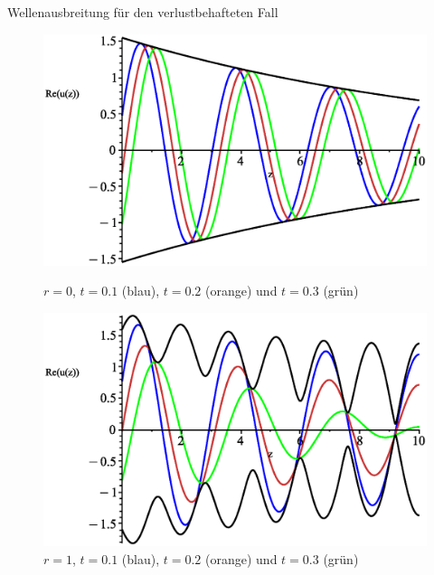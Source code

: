 \documentclass{beamer}
\begin{document}
\begin{frame}{Wellenausbreitung für den verlustbehafteten Fall}
    \begin{figure}[H]
        \begin{minipage}{0.32\textwidth}
            \centering
            \includegraphics[width=\linewidth]{../graphics/Enveloppe/verlustbehaftet/R0}
            \caption*{$r=0$, $t=0.1$ (blau), $t=0.2$ (orange) und $t=0.3$ (grün)}
        \end{minipage}
        \hfill
        \begin{minipage}{0.32\textwidth}
            \centering
            \includegraphics[width=\linewidth]{../graphics/Enveloppe/verlustbehaftet/R1}
            \caption*{$r=1$, $t=0.1$ (blau), $t=0.2$ (orange) und $t=0.3$ (grün)}
        \end{minipage}
        \hfill
        \begin{minipage}{0.32\textwidth}
            \centering

\end{minipage}
\end{figure}
\end{frame}
\end{document}
